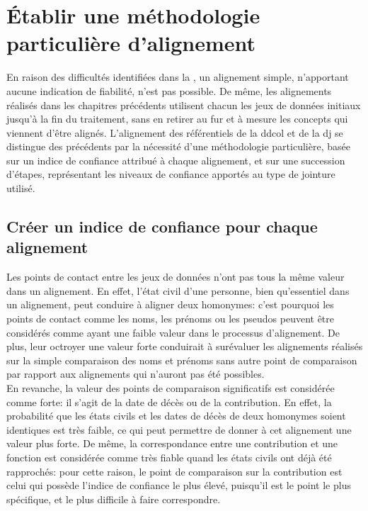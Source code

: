 \section{\label{III-C-2}Établir une méthodologie particulière d'alignement}

En raison des difficultés identifiées dans la , un alignement simple, n'apportant aucune indication de fiabilité, n'est pas possible. De même, les alignements réalisés dans les chapitres précédents utilisent chacun les jeux de données initiaux jusqu'à la fin du traitement, sans en retirer au fur et à mesure les concepts qui viennent d'être alignés. L'alignement des référentiels de la \ac{ddcol} et de la \ac{dj} se distingue des précédents par la nécessité d'une méthodologie particulière, basée sur un indice de confiance attribué à chaque alignement, et sur une succession d'étapes, représentant les niveaux de confiance apportés au type de jointure utilisé.

\subsection{\label{III-C-2-a}Créer un indice de confiance pour chaque alignement}

Les points de contact entre les jeux de données n'ont pas tous la même valeur dans un alignement. En effet, l'état civil d'une personne, bien qu'essentiel dans un alignement, peut conduire à aligner deux homonymes: c'est pourquoi les points de contact comme les noms, les prénoms ou les pseudos peuvent être considérés comme ayant une faible valeur dans le processus d'alignement. De plus, leur octroyer une valeur forte conduirait à surévaluer les alignements réalisés sur la simple comparaison des noms et prénoms sans autre point de comparaison par rapport aux alignements qui n'auront pas été possibles.\\

En revanche, la valeur des points de comparaison significatifs est considérée comme forte: il s'agit de la date de décès ou de la contribution. En effet, la probabilité que les états civils et les dates de décès de deux homonymes soient identiques est très faible, ce qui peut permettre de donner à cet alignement une valeur plus forte. De même, la correspondance entre une contribution et une fonction est considérée comme très fiable quand les états civils ont déjà été rapprochés: pour cette raison, le point de comparaison sur la contribution est celui qui possède l'indice de confiance le plus élevé, puisqu'il est le point le plus spécifique, et le plus difficile à faire correspondre.\\

